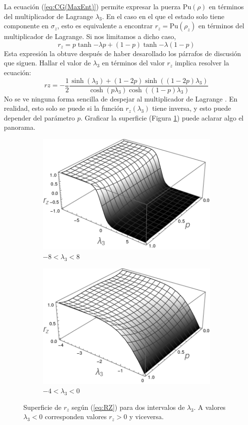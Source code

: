 La ecuación (\ref{eq:CG(MaxEnt)}) permite expresar la puerza $\text{Pu}(\rho)$ en términos del multiplicador de Lagrange $\lambda_{3}$. En el caso en el que el estado solo tiene componente en $\sigma_{z}$, esto es equivalente a encontrar $r_{z}=\text{Pu}(\rho_{z})$ en términos del multiplicador de Lagrange. Si nos limitamos a dicho caso,
\begin{equation}\label{eq:RzTanh}
    \boxed{r_{z}=p\tanh{-\lambda p}+(1-p)\tanh{-\lambda (1-p)}}
\end{equation}
Esta expresión la obtuve después de haber desarollado los párrafos de discusión que siguen. Hallar el valor de $\lambda_{3}$ en términos del valor $r_{z}$ implica resolver la ecuación:
\begin{equation}\label{eq:RZ}
rz=-\frac{1}{2}\frac{\sinh(\lambda_{3})+(1-2p)\sinh((1-2p)\lambda_{3})}{\cosh(p\lambda_{3})\cosh((1-p)\lambda_{3})}
\end{equation}
No se ve ninguna forma sencilla de despejar al multiplicador de Lagrange . En realidad, esto solo se puede si la función $r_{z}(\lambda_{3})$ tiene inversa, y esto puede depender del parámetro $p$. Graficar la superficie (Figura \ref{fig:rzsurf}) puede aclarar algo el panorama.
\begin{figure}[h!]
\centering
\begin{subfigure}{0.475\textwidth}
  \centering
  \includegraphics[width=0.6\linewidth]{maxent/figures/LagrangeMult_lambda-8to8.png}
  \caption{$-8<\lambda_{3}<8$}
\end{subfigure}%
\begin{subfigure}{0.475\textwidth}
  \centering
  \includegraphics[width=0.6\linewidth]{maxent/figures/LagrangeMult_lambda-4to0.png}
  \caption{$-4<\lambda_{3}<0$}
\end{subfigure}
\caption{Superficie de $r_{z}$ según (\ref{eq:RZ}) para dos intervalos de $\lambda_{3}$. A valores $\lambda_{3}<0$ corresponden valores $r_{z}>0$ y viceversa.}
\label{fig:rzsurf}
\end{figure}

